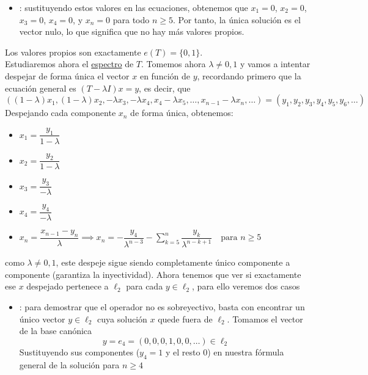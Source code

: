 \begin{ejercicio}
\begin{itemize}
        \item {}: sustituyendo estos valores en las ecuaciones, obtenemos que $x_1 = 0$, $x_2 = 0$, $x_3 = 0$, $x_4 = 0$, y $x_n = 0$ para todo $n \geq 5$. Por tanto, la única solución es el vector nulo, lo que significa que no hay más valores propios.
    \end{itemize}
    Los valores propios son exactamente $e(T) = \{0, 1\}$. \\

    \noindent
    Estudiaremos ahora el \underline{espectro} de $T$. Tomemos ahora $\lambda \neq 0,1$ y vamos a intentar despejar de forma única el vector $x$ en función de $y$, recordando primero que la ecuación general es $(T - \lambda I)x = y$, es decir, que
    \begin{equation*}
        \left( \left(1 - \lambda\right)x_1, \left(1 - \lambda\right)x_2, -\lambda x_3, -\lambda x_4, x_4-\lambda x_5 , \dots, x_{n-1}-\lambda x_n , \dots \right) = (y_1, y_2, y_3, y_4, y_5, y_6, \dots)
    \end{equation*}
    Despejando cada componente $x_n$ de forma única, obtenemos:
    \begin{itemize}
        \item $x_1 = \dfrac{y_1}{1 - \lambda}$
        \item $x_2 = \dfrac{y_2}{1 - \lambda}$
        \item $x_3 = \dfrac{y_3}{-\lambda}$
        \item $x_4 = \dfrac{y_4}{-\lambda}$
        \item $x_n = \dfrac{x_{n-1} - y_n}{\lambda} \implies x_n = -\dfrac{y_4}{\lambda^{n-3}} - \sum\limits_{k=5}^{n} \dfrac{y_k}{\lambda^{n-k+1}} \quad \text{para } n \geq 5$
    \end{itemize}
    como $\lambda \neq 0,1$, este despeje sigue siendo completamente único componente a componente (garantiza la inyectividad). Ahora tenemos que ver si exactamente ese $x$ despejado pertenece a $\ell_2$ para cada $y \in \ell_2$, para ello veremos dos casos
    \begin{itemize}
        \item {}: para demostrar que el operador no es sobreyectivo, basta con encontrar un único vector $y \in \ell_2$ cuya solución $x$ quede fuera de $\ell_2$. Tomamos el vector de la base canónica 
        $$y = e_4 = (0, 0, 0, 1, 0, 0, \dots) \in \ell_2$$
        Sustituyendo sus componentes ($y_4 = 1$ y el resto $0$) en nuestra fórmula general de la solución para $n \ge 4$

\end{itemize}
\end{ejercicio}
